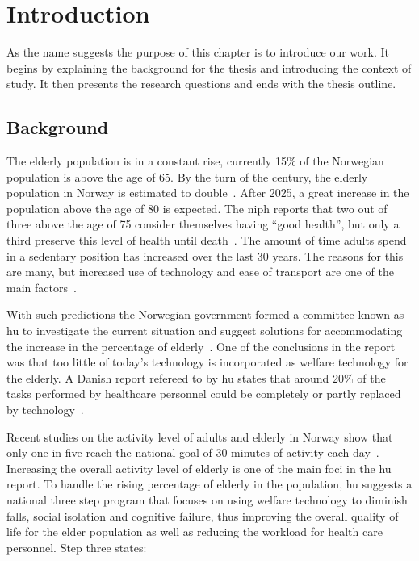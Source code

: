 \chapter{Introduction}
As the name suggests the purpose of this chapter is to introduce our work. It begins by explaining the background for the thesis and introducing the context of study. It then presents the research questions and ends with the thesis outline.

\section{Background}
The elderly population is in a constant rise, currently 15\% of the Norwegian population is above the age of 65. By the turn of the century, the elderly population in Norway is estimated to double~\cite{elder}. After 2025, a great increase in the population above the age of 80 is expected. The \gls{niph} reports that two out of three above the age of 75 consider themselves having ``good health'', but only a third preserve this level of health until death~\cite{elder}. The amount of time adults spend in a sedentary position has increased over the last 30 years. The reasons for this are many, but increased use of technology and ease of transport are one of the main factors~\cite{sedentaryBehaviour}.

With such predictions the Norwegian government formed a committee known as \gls{hu} to investigate the current situation and suggest solutions for accommodating the increase in the percentage of elderly~\cite{haagen}. One of the conclusions in the report was that too little of today's technology is incorporated as welfare technology for the elderly. A Danish report refereed to by \gls{hu} states that around 20\% of the tasks performed by healthcare personnel could be completely or partly replaced by technology~\cite{kmd}. 

Recent studies on the activity level of adults and elderly in Norway show that only one in five reach the national goal of 30 minutes of activity each day~\cite{fysiskAktivitet2009}. Increasing the overall activity level of elderly is one of the main foci in the \gls{hu} report. To handle the rising percentage of elderly in the population, \gls{hu} suggests a national three step program that focuses on using welfare technology to diminish falls, social isolation and cognitive failure, thus improving the overall quality of life for the elder population as well as reducing the workload for health care personnel. Step three states:

